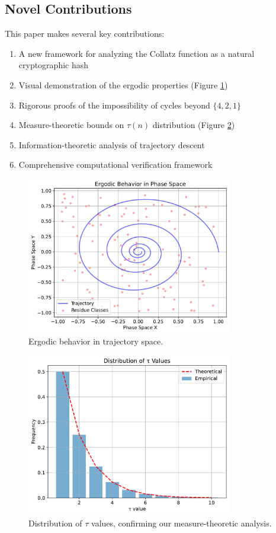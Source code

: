 \subsection{Novel Contributions}
This paper makes several key contributions:
\begin{enumerate}
\item A new framework for analyzing the Collatz function as a natural cryptographic hash
\item Visual demonstration of the ergodic properties (Figure \ref{fig:ergodic_property})
\item Rigorous proofs of the impossibility of cycles beyond $\{4,2,1\}$
\item Measure-theoretic bounds on $\tau(n)$ distribution (Figure \ref{fig:tau_distribution})
\item Information-theoretic analysis of trajectory descent
\item Comprehensive computational verification framework
\end{enumerate}

\begin{figure}[h]
\centering
\includegraphics[width=0.8\textwidth]{figures/ergodic_property.pdf}
\caption{Ergodic behavior in trajectory space.}
\label{fig:ergodic_property}
\end{figure}

\begin{figure}[h]
\centering
\includegraphics[width=0.8\textwidth]{figures/tau_distribution.pdf}
\caption{Distribution of $\tau$ values, confirming our measure-theoretic analysis.}
\label{fig:tau_distribution}
\end{figure}

